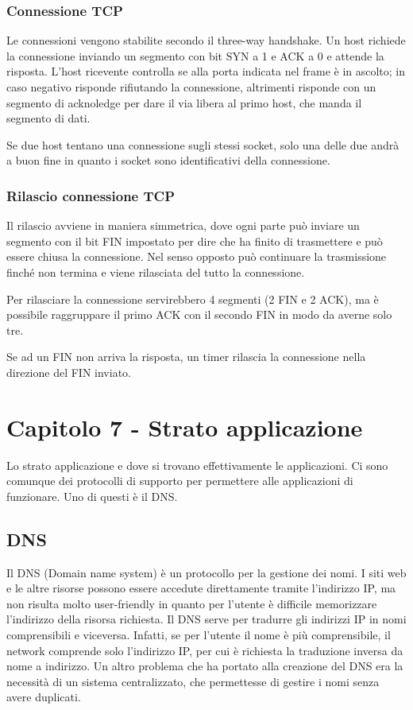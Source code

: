 \subsubsection{Connessione TCP}
Le connessioni vengono stabilite secondo il three-way handshake.
Un host richiede la connessione inviando un segmento con bit SYN a 1 e ACK a 0 e attende la risposta.
L'host ricevente controlla se alla porta indicata nel frame è in ascolto; in caso negativo risponde rifiutando la connessione, 
altrimenti risponde con un segmento di acknoledge per dare il via libera al primo host, che manda il segmento di dati.

Se due host tentano una connessione sugli stessi socket, solo una delle due andrà a buon fine in quanto i socket sono identificativi della connessione.

\subsubsection{Rilascio connessione TCP}
Il rilascio avviene in maniera simmetrica, dove ogni parte può inviare un segmento con il bit FIN impostato per dire che ha finito di trasmettere e può essere chiusa la connessione.
Nel senso opposto può continuare la trasmissione finché non termina e viene rilasciata del tutto la connessione.

Per rilasciare la connessione servirebbero 4 segmenti (2 FIN e 2 ACK), ma è possibile raggruppare il primo ACK con il secondo FIN in modo da averne solo tre.

Se ad un FIN non arriva la risposta, un timer rilascia la connessione nella direzione del FIN inviato.

\newpage
\section{Capitolo 7 - Strato applicazione}

Lo strato applicazione e dove si trovano effettivamente le applicazioni.
Ci sono comunque dei protocolli di supporto per permettere alle applicazioni di funzionare.
Uno di questi è il DNS.

\subsection{DNS}

Il DNS (Domain name system) è un protocollo per la gestione dei nomi.
I siti web e le altre risorse possono essere accedute direttamente tramite l'indirizzo IP,
ma non risulta molto user-friendly in quanto per l'utente è difficile memorizzare l'indirizzo della risorsa richiesta.
Il DNS serve per tradurre gli indirizzi IP in nomi comprensibili e viceversa.
Infatti, se per l'utente il nome è più comprensibile, il network comprende solo l'indirizzo IP, per cui è richiesta la traduzione inversa da nome a indirizzo.
Un altro problema che ha portato alla creazione del DNS era la necessità di un sistema centralizzato, che permettesse di gestire i nomi senza avere duplicati.

